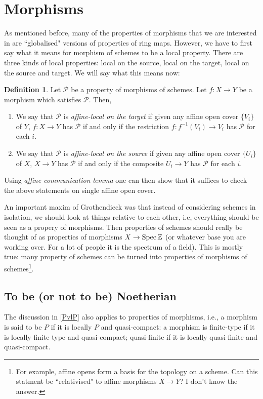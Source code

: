 \documentclass[11pt]{amsart}
\newcommand{\Spec}{{\rm Spec \,}}
\newcommand{\Z}{{\mathbb Z}}
\theoremstyle{definition}
\newtheorem{definition}[theorem]{Definition}
\begin{document}
\section{Morphisms}
As mentioned before, many of the properties of morphisms that we are interested in are ``globalised" versions of properties of ring maps. However, we have to first say what it means for morphism of schemes to be a local property. There are three kinds of local properties: local on the source, local on the target, local on the source and target. We will say what this means now:

\begin{definition}\label{locally-P-morphisms}
	Let $\mathcal{P}$ be a property of morphisms of schemes. Let $f:X\rightarrow Y$ be a morphism which satisfies $\mathcal{P}$. Then,
	\begin{enumerate}
		\item We say that $\mathcal{P}$ is \textit{affine-local on the target} if given any affine open cover $\lbrace V_i\rbrace$ of $Y$, $f:X\rightarrow Y$ has $\mathcal{P}$ if and only if the restriction $f: f^{-1}(V_i)\rightarrow V_i$ has $\mathcal{P}$ for each $i$.
		\item We say that $\mathcal{P}$ is \textit{affine-local on the source} if given any affine open cover $\lbrace U_i\rbrace$ of $X$, $X\rightarrow Y$ has $\mathcal{P}$ if and only if the composite $U_i\rightarrow Y$ has $\mathcal{P}$ for each $i$.
	\end{enumerate}
\end{definition}

Using \textit{affine communication lemma} one can then show that it suffices to check the above statements on single affine open cover.

An important maxim of Grothendieck was that instead of considering schemes in isolation, we should look at things relative to each other, i.e, everything should be seen as a propery of morphisms. Then properties of schemes should really be thought of as properties of morphisms $X\rightarrow\Spec \Z$ (or whatever base you are working over. For a lot of people it is the spectrum of a field). This is mostly true: many property of schemes can be turned into properties of morphisms of schemes\footnote{For example, affine opens form a basis for the topology on a scheme. Can this statment be ``relativised" to affine morphisms $X\rightarrow Y$? I don't know the answer.}.

\subsection{To be (or not to be) Noetherian} The discussion in \ref{PvlP} also applies to properties of morphisms, i.e., a morphism is said to be $P$ if it is locally $P$ and quasi-compact: a morphism is finite-type if it is locally finite type and quasi-compact; quasi-finite if it is locally quasi-finite and quasi-compact.
\end{document}
